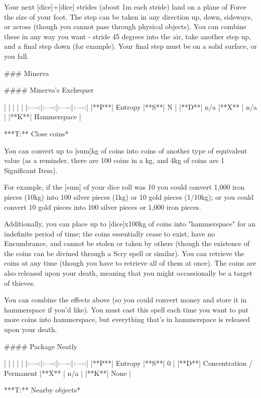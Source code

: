 Your next [dice]+[dice] strides (about 1m each stride) land on a plane of Force the size of your foot.  The step can be taken in any direction up, down, sideways, or across (though you cannot pass through physical objects).  You can combine these in any way you want - stride 45 degrees into the air, take another step up, and a final step down (for example).  Your final step must be on a solid surface, or you fall. 


### Minerva





#### Minerva's Exchequer

| | | | |
|:----:|:----:|:----:|:----:|
|**P**| Entropy |**S**|  N |
|**D**| n/a |**X** |  n/a  |
|**K**| Hammerspace |


***T:**   Close coins*



You can convert up to [sum]kg of coins into coins of another type of equivalent value (as a reminder, there are 100 coins in a kg, and 4kg of coins are 1 Significant Item).

For example, if the [sum] of your dice roll was 10 you could convert 1,000 iron pieces (10kg) into 100 silver pieces (1kg) or 10 gold pieces (1/10kg); or you could convert 10 gold pieces into 100 silver pieces or 1,000 iron pieces.



Additionally, you can place up to [dice]x100kg of coins into "hammerspace" for an indefinite period of time; the coins essentially cease to exist, have no Encumbrance, and cannot be stolen or taken by others (though the existence of the coins can be divined through a Scry spell or similar).  You can retrieve the coins at any time (though you have to retrieve all of them at once).  The coins are also released upon your death, meaning that you might occassionally be a target of thieves.

You can combine the effects above (so you could convert money and store it in hammerspace if you'd like).  You must cast this spell each time you want to put more coins into hammerspace, but everything that's in hammerspace is released upon your death.



#### Package Neatly

| | | | |
|:----:|:----:|:----:|:----:|
|**P**| Entropy |**S**|  0 |
|**D**| Concentration / Permanent |**X** |  n/a  |
|**K**| None |


***T:**   Nearby objects*



